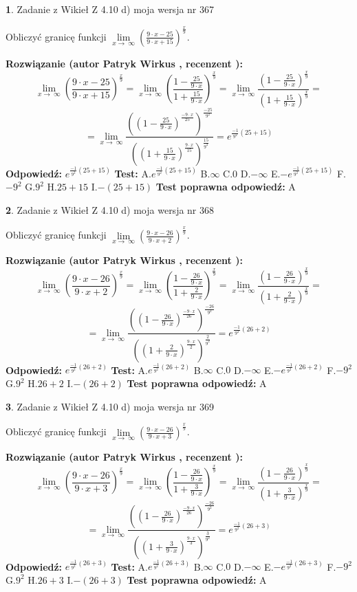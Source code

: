 \documentclass[12pt, a4paper]{article}
\theoremstyle{definition} %
\newtheorem{zad}{}
\newcommand{\zadStart}[1]{\begin{zad}#1\newline}
\newcommand{\zadStop}{\end{zad}}
\newcommand{\rozwStart}[2]{\noindent \textbf{Rozwiązanie (autor #1 , recenzent #2): }\newline}
\newcommand{\rozwStop}{\newline}
\newcommand{\odpStart}{\noindent \textbf{Odpowiedź:}\newline}
\newcommand{\odpStop}{\newline}
\newcommand{\testStart}{\noindent \textbf{Test:}\newline}
\newcommand{\testStop}{\newline}
\newcommand{\kluczStart}{\noindent \textbf{Test poprawna odpowiedź:}\newline}
\newcommand{\kluczStop}{\newline}
\begin{document}
\zadStart{Zadanie z Wikieł Z 4.10 d) moja wersja nr 367}


Obliczyć granicę funkcji  $\lim\limits_{x\to\ \infty}(\frac{9\cdot x-25}{9\cdot x+15})^{\frac{x}{9}}$.
\zadStop
\rozwStart{Patryk Wirkus}{}
$$\lim\limits_{x\to\ \infty}(\frac{9\cdot x-25}{9\cdot x+15})^{\frac{x}{9}} = \lim\limits_{x\to\ \infty}(\frac{1-\frac{25}{9\cdot x}}{1+\frac{15}{9\cdot x}})^{\frac{x}{9}}=\lim\limits_{x\to\ \infty}\frac{(1-\frac{25}{9\cdot x})^{\frac{x}{9}}}{(1+\frac{15}{9\cdot x})^{\frac{x}{9}}}=$$
$$=\lim\limits_{x\to\ \infty}\frac{((1-\frac{25}{9\cdot x})^{\frac{-9\cdot x}{25}})^{\frac{-25}{9^{2}}}}{((1+\frac{15}{9\cdot x})^{\frac{9\cdot x}{15}})^{\frac{15}{9^{2}}}}=e^{\frac{-1}{9^{2}}(25+15)}$$
\rozwStop
\odpStart
$e^{\frac{-1}{9^{2}}(25+15)}$
\odpStop
\testStart
A.$e^{\frac{-1}{9^{2}}(25+15)}$ B.$\infty$ C.$0$ D.$-\infty$ E.$-e^{\frac{-1}{9^{2}}(25+15)}$
F.$-9^{2}$ G.$9^{2}$
H.$25+15$
I.$-(25+15)$
\testStop
\kluczStart
A
\kluczStop



\zadStart{Zadanie z Wikieł Z 4.10 d) moja wersja nr 368}


Obliczyć granicę funkcji  $\lim\limits_{x\to\ \infty}(\frac{9\cdot x-26}{9\cdot x+2})^{\frac{x}{9}}$.
\zadStop
\rozwStart{Patryk Wirkus}{}
$$\lim\limits_{x\to\ \infty}(\frac{9\cdot x-26}{9\cdot x+2})^{\frac{x}{9}} = \lim\limits_{x\to\ \infty}(\frac{1-\frac{26}{9\cdot x}}{1+\frac{2}{9\cdot x}})^{\frac{x}{9}}=\lim\limits_{x\to\ \infty}\frac{(1-\frac{26}{9\cdot x})^{\frac{x}{9}}}{(1+\frac{2}{9\cdot x})^{\frac{x}{9}}}=$$
$$=\lim\limits_{x\to\ \infty}\frac{((1-\frac{26}{9\cdot x})^{\frac{-9\cdot x}{26}})^{\frac{-26}{9^{2}}}}{((1+\frac{2}{9\cdot x})^{\frac{9\cdot x}{2}})^{\frac{2}{9^{2}}}}=e^{\frac{-1}{9^{2}}(26+2)}$$
\rozwStop
\odpStart
$e^{\frac{-1}{9^{2}}(26+2)}$
\odpStop
\testStart
A.$e^{\frac{-1}{9^{2}}(26+2)}$ B.$\infty$ C.$0$ D.$-\infty$ E.$-e^{\frac{-1}{9^{2}}(26+2)}$
F.$-9^{2}$ G.$9^{2}$
H.$26+2$
I.$-(26+2)$
\testStop
\kluczStart
A
\kluczStop



\zadStart{Zadanie z Wikieł Z 4.10 d) moja wersja nr 369}


Obliczyć granicę funkcji  $\lim\limits_{x\to\ \infty}(\frac{9\cdot x-26}{9\cdot x+3})^{\frac{x}{9}}$.
\zadStop
\rozwStart{Patryk Wirkus}{}
$$\lim\limits_{x\to\ \infty}(\frac{9\cdot x-26}{9\cdot x+3})^{\frac{x}{9}} = \lim\limits_{x\to\ \infty}(\frac{1-\frac{26}{9\cdot x}}{1+\frac{3}{9\cdot x}})^{\frac{x}{9}}=\lim\limits_{x\to\ \infty}\frac{(1-\frac{26}{9\cdot x})^{\frac{x}{9}}}{(1+\frac{3}{9\cdot x})^{\frac{x}{9}}}=$$
$$=\lim\limits_{x\to\ \infty}\frac{((1-\frac{26}{9\cdot x})^{\frac{-9\cdot x}{26}})^{\frac{-26}{9^{2}}}}{((1+\frac{3}{9\cdot x})^{\frac{9\cdot x}{3}})^{\frac{3}{9^{2}}}}=e^{\frac{-1}{9^{2}}(26+3)}$$
\rozwStop
\odpStart
$e^{\frac{-1}{9^{2}}(26+3)}$
\odpStop
\testStart
A.$e^{\frac{-1}{9^{2}}(26+3)}$ B.$\infty$ C.$0$ D.$-\infty$ E.$-e^{\frac{-1}{9^{2}}(26+3)}$
F.$-9^{2}$ G.$9^{2}$
H.$26+3$
I.$-(26+3)$
\testStop
\kluczStart
A
\kluczStop
\end{document}
